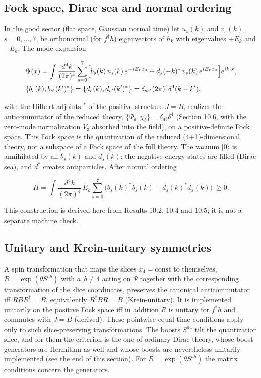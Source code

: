 \documentclass[11pt]{article}
\begin{document}
\subsection{Fock space, Dirac sea and normal ordering}

In the good sector (flat space, Gaussian normal time) let $u_s(k)$ and $v_s(k)$, $s=0,\dots,7$, be orthonormal (for $f^\dagger h$) eigenvectors of $h_k$ with eigenvalues $+E_k$ and $-E_k$. The mode expansion

\[
\begin{aligned}
&\Psi(x)=\int\frac{d^4k}{(2\pi)^4}\sum_{s=0}^{7}\Bigl[b_s(k)\,u_s(k)\,e^{-iE_kx_4}+d_s(-k)^\ast\,v_s(k)\,e^{iE_kx_4}\Bigr]e^{ik\cdot x},\\
&\{b_s(k),b_{s'}(k')^\ast\}=\{d_s(k),d_{s'}(k')^\ast\}=\delta_{ss'}(2\pi)^4\delta^4(k-k'),
\end{aligned}
\]

with the Hilbert adjoints ${}^\ast$ of the positive structure $J=B$, realizes the anticommutator of the reduced theory, $\{\Psi_a,\chi_b\}=\delta_{ab}\delta^4$ (Section 10.6, with the zero-mode normalization $V_3$ absorbed into the field), on a positive-definite Fock space. This Fock space is the quantization of the reduced (4+1)-dimensional theory, not a subspace of a Fock space of the full theory. The vacuum $|0\rangle$ is annihilated by all $b_s(k)$ and $d_s(k)$: the negative-energy states are filled (Dirac sea), and $d^\ast$ creates antiparticles. After normal ordering

\[
H=\int\frac{d^4k}{(2\pi)^4}\,E_k\sum_{s=0}^{7}\bigl(b_s(k)^\ast b_s(k)+d_s(k)^\ast d_s(k)\bigr)\ \ge0 .
\]

This construction is derived here from Results 10.2, 10.4 and 10.5; it is not a separate machine check.

\subsection{Unitary and Krein-unitary symmetries}

A spin transformation that maps the slices $x_4=\text{const}$ to themselves, $R=\exp(\theta S^{ab})$ with $a,b\ne4$ acting on $\Psi$ together with the corresponding transformation of the slice coordinates, preserves the canonical anticommutator iff $RBR^\dagger=B$, equivalently $R^\dagger BR=B$ (Krein-unitary). It is implemented unitarily on the positive Fock space iff in addition $R$ is unitary for $f^\dagger h$ and commutes with $J=B$ (derived). These pointwise equal-time conditions apply only to such slice-preserving transformations. The boosts $S^{a4}$ tilt the quantization slice, and for them the criterion is the one of ordinary Dirac theory, whose boost generators are Hermitian as well and whose boosts are nevertheless unitarily implemented (see the end of this section). For $R=\exp(\theta S^{ab})$ the matrix conditions concern the generators.
\end{document}
